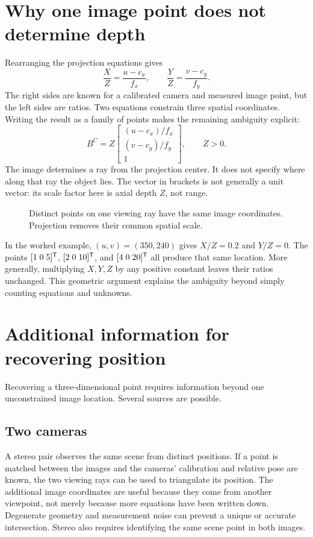 \section{Why one image point does not determine depth}
Rearranging the projection equations gives
\begin{equation}
 \frac XZ=\frac{u-c_x}{f_x},\qquad
 \frac YZ=\frac{v-c_y}{f_y}.
 \label{eq:l07-inverse}
\end{equation}
The right sides are known for a calibrated camera and measured image point,
but the left sides are ratios. Two equations constrain three spatial
coordinates. Writing the result as a family of points makes the remaining
ambiguity explicit:
\begin{equation}
 \boxed{B^C=Z\begin{bmatrix}(u-c_x)/f_x\\(v-c_y)/f_y\\1\end{bmatrix},
 \qquad Z>0.}
 \label{eq:l07-ray}
\end{equation}
The image determines a ray from the projection center. It does not specify
where along that ray the object lies. The vector in brackets is not generally
a unit vector: its scale factor here is axial depth $Z$, not range.

\begin{figure}[htbp]
\centering
\caption{Distinct points on one viewing ray have the same image coordinates.
Projection removes their common spatial scale.}
\label{fig:l07-ray}
\end{figure}

In the worked example, $(u,v)=(350,240)$ gives $X/Z=0.2$ and $Y/Z=0$.
The points $[1\;0\;5]^{\mathsf T}$, $[2\;0\;10]^{\mathsf T}$, and
$[4\;0\;20]^{\mathsf T}$ all produce that same location. More generally,
multiplying $X,Y,Z$ by any positive constant leaves their ratios unchanged.
This geometric argument explains the ambiguity beyond simply counting
equations and unknowns.

\section{Additional information for recovering position}
Recovering a three-dimensional point requires information beyond one
unconstrained image location. Several sources are possible.

\subsection{Two cameras}
A stereo pair observes the same scene from distinct positions. If a point
is matched between the images and the cameras' calibration and relative
pose are known, the two viewing rays can be used to triangulate its position.
The additional image coordinates are useful because they come from another
viewpoint, not merely because more equations have been written down.
Degenerate geometry and measurement noise can prevent a unique or accurate
intersection. Stereo also requires identifying the same scene point in
both images.

